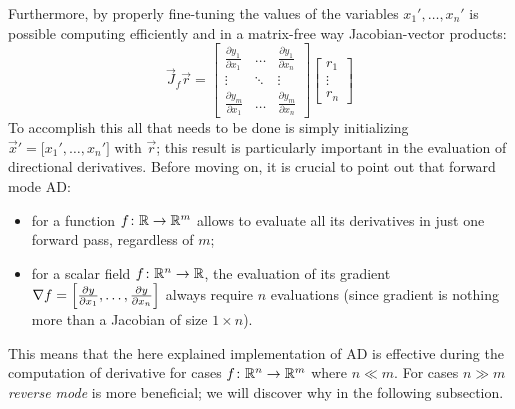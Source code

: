 Furthermore, by properly fine-tuning the values of the variables $x_1', \dots, x_n'$ is possible computing efficiently and in a matrix-free way Jacobian-vector products:
\[
\vec{J}_f \vec{r} =
\begin{bmatrix}
	\frac{\partial y_1}{\partial x_1} &  \dots  & \frac{\partial y_1}{\partial x_n}  \\
	\vdots							  & \ddots  & \vdots							 \\
	\frac{\partial y_m}{\partial x_1} &  \dots  & \frac{\partial y_m}{\partial x_n}
\end{bmatrix}
\begin{bmatrix}
	r_1		\\
	\vdots  \\
	r_n
\end{bmatrix}
\]
To accomplish this all that needs to be done is simply initializing $\vec{x}'=\big[x_1', \dots, x_n' \big]$ with $\vec{r}$; this result is particularly important in the evaluation of directional derivatives.
Before moving on, it is crucial to point out that forward mode AD:
\begin{itemize}
	\item for a function $f \colon \mathbb{R} \to \mathbb{R}^m$ allows to evaluate all its derivatives in just one forward pass, regardless of $m$;
	\item for a scalar field $f \colon \mathbb{R}^n \to \mathbb{R}$, the evaluation of its gradient $\nabla f = \Bigl[ \frac{\partial y}{\partial x_1}, \dots, \frac{\partial y}{\partial x_n} \Bigr]$ always require $n$ evaluations (since gradient is nothing more than a Jacobian of size $1 \times n$).
\end{itemize}
This means that the here explained implementation of AD is effective during the computation of derivative for cases $f \colon \mathbb{R}^n \to \mathbb{R}^m$ where $n \ll m$. For cases $n \gg m$ \emph{reverse mode} is more beneficial; we will discover why in the following subsection.

